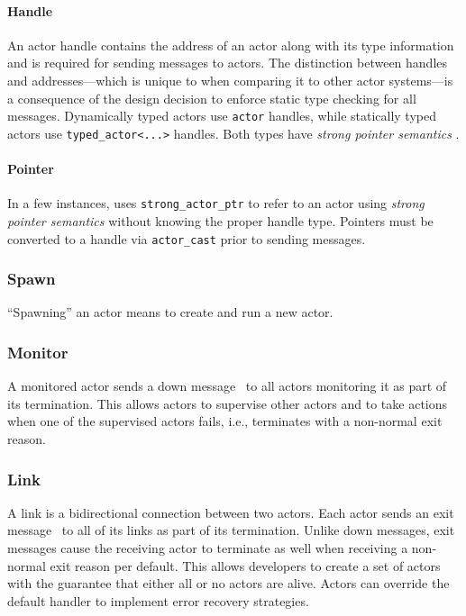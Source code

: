 \paragraph{Handle}
\label{actor-handle}

An actor handle contains the address of an actor along with its type information and is required for sending messages to actors. The distinction between handles and addresses---which is unique to \lib when comparing it to other actor systems---is a consequence of the design decision to enforce static type checking for all messages. Dynamically typed actors use \lstinline^actor^ handles, while statically typed actors use \lstinline^typed_actor<...>^ handles. Both types have \emph{strong pointer semantics} .

\paragraph{Pointer}
\label{actor-pointer}

In a few instances, \lib uses \lstinline^strong_actor_ptr^ to refer to an actor using \emph{strong pointer semantics}  without knowing the proper handle type. Pointers must be converted to a handle via \lstinline^actor_cast^  prior to sending messages.

\subsubsection{Spawn}

``Spawning'' an actor means to create and run a new actor.

\subsubsection{Monitor}
\label{sec:monitoring}

A monitored actor sends a down message~ to all actors monitoring it as part of its termination.
This allows actors to supervise other actors and to take actions when one of the supervised actors fails, i.e., terminates with a non-normal exit reason.

\subsubsection{Link}

A link is a bidirectional connection between two actors.
Each actor sends an exit message~ to all of its links as part of its termination.
Unlike down messages, exit messages cause the receiving actor to terminate as well when receiving a non-normal exit reason per default.
This allows developers to create a set of actors with the guarantee that either all or no actors are alive.
Actors can override the default handler to implement error recovery strategies.
